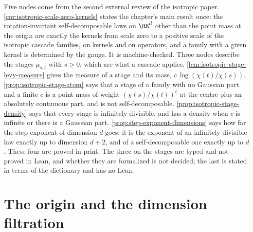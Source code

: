 Five nodes come from the second external review of the isotropic paper.
\ref{cor:isotropic-scale-zero-kernels} states the chapter's main result once: the
rotation-invariant self-decomposable laws on $\RR^d$ other than the point mass at the origin are
exactly the kernels from scale zero to a positive scale of the isotropic cascade families, on
kernels and on operators, and a family with a given kernel is determined by the gauge. It is
machine-checked. Three nodes describe the stages $\mu_{s,t}$ with $s > 0$, which are what a
cascade applies. \ref{lem:isotropic-stage-levy-measure} gives the \Levy{} measure of a stage and
its mass, $c\,\log(\chi(t)/\chi(s))$. \ref{prop:isotropic-stage-atom} says that a stage of a
family with no Gaussian part and a finite $c$ is a point mass of weight $(\chi(s)/\chi(t))^c$ at
the centre plus an absolutely continuous part, and is not self-decomposable.
\ref{prop:isotropic-stage-density} says that every stage is infinitely divisible, and has a
density when $c$ is infinite or there is a Gaussian part. \ref{prop:step-exponent-dimensions}
says how far the step exponent of dimension $d$ goes: it is the exponent of an infinitely
divisible law exactly up to dimension $d + 2$, and of a self-decomposable one exactly up to
$d$. These four are proved in print. The three on the stages are typed and not proved in Lean,
and whether they are formalized is not decided; the last is stated in terms of the dictionary
and has no Lean.

\section{The origin and the dimension filtration}
\label{sec:isotropic-origin}

